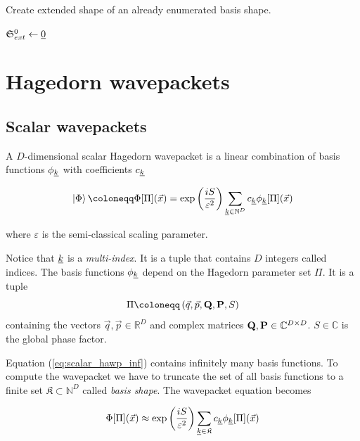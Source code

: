 \documentclass{article}
\begin{document}
\begin{algorithm}[H]
  \caption{Create extended shape of an already enumerated basis shape.}
  \(\mathfrak{S}_{ext}^0 \leftarrow \underline{0}\)\;
\end{algorithm}

\section{Hagedorn wavepackets}
\subsection{Scalar wavepackets}
A \(D\)-dimensional scalar Hagedorn wavepacket is a linear combination of basis functions \(\phi_{\underline{k}}\)
with coefficients \(c_{\underline{k}}\)

\begin{equation}
  \label{eq:scalar_hawp_inf}
  \ket{\Phi} \coloneqq \Phi[\Pi](\vec{x}) = \exp{\left(\frac{iS}{\varepsilon^2}\right)} 
  \sum_{\mindex{k} \in \mathbb{N}^D} c_{\mindex{k}}\phi_{\mindex{k}}[\Pi](\vec{x})
\end{equation}

where \(\varepsilon\) is the semi-classical scaling parameter.\par
Notice that \(\underline{k}\) is a \emph{multi-index}. It is a tuple that
contains \(D\) integers called indices.
The basis functions \(\phi_{\underline{k}}\) depend on the
Hagedorn parameter set \(\Pi\). It is a tuple
\[
  \Pi \coloneqq \left(\vec{q},\vec{p},\mat{Q},\mat{P},S\right)
\]
containing the vectors \( \vec{q},\vec{p} \in \mathbb{R}^D \) and
complex matrices \( \mathbf{Q},\mathbf{P} \in \mathbb{C}^{D \times D} \). \(S\in \mathbb{C}\) is
the global phase factor.

Equation (\ref{eq:scalar_hawp_inf}) contains infinitely many basis functions.
To compute the wave\-packet we have to truncate the set of all basis functions to
a finite set \(\mathfrak{K} \subset \mathbb{N}^D\) called \emph{basis shape}.
The wavepacket equation becomes

\[
  \Phi[\Pi](\vec{x}) \approx \exp{\left(\frac{iS}{\varepsilon^2}\right)}
  \sum_{\underline{k} \in \mathfrak{K}}c_{\underline{k}}\phi_{\underline{k}}[\Pi](\vec{x})
\]
\end{document}
